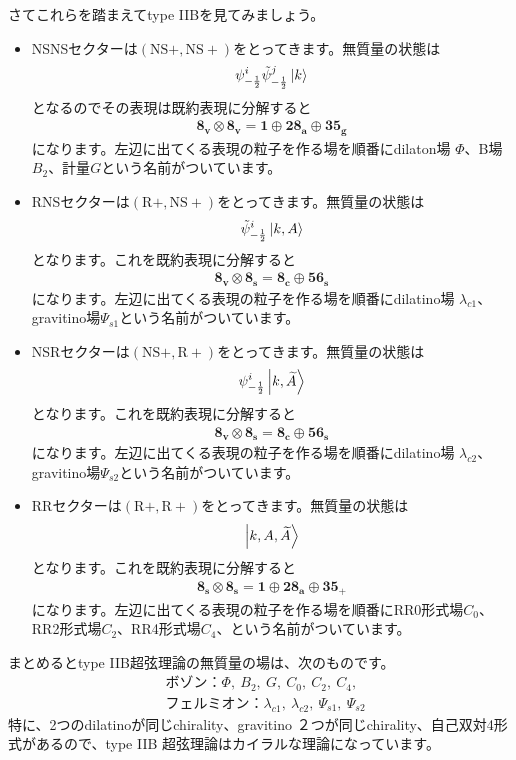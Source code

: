 \documentclass[report,paper=a4, fontsize=12pt, line_length=16cm, number_of_lines=33,dvipdfmx]{jlreq}
\numberwithin{equation}{chapter}
\numberwithin{equation}{section}
\newcommand{\At}{\widetilde{A}}
\newcommand{\psit}{\tilde{\psi}}
\newcommand{\NSp}{\mathrm{NS}+}
\newcommand{\Rp}{\mathrm{R}+}
\newcommand{\triv}{\mathbf{1}}
\newcommand{\etv}{\mathbf{8_v}}
\newcommand{\ets}{\mathbf{8_s}}
\newcommand{\etc}{\mathbf{8_c}}
\newcommand{\tweta}{\mathbf{28_{a}}}
\newcommand{\thfvg}{\mathbf{35_{g}}}
\newcommand{\thfvp}{\mathbf{35}_{+}}
\newcommand{\fsxs}{\mathbf{56_s}}
\begin{document}
さてこれらを踏まえてtype IIBを見てみましょう。
\begin{itemize}
  \item NSNSセクターは$(\NSp,\NSp)$をとってきます。無質量の状態は
  \begin{align}
    \psi_{-\frac12}^{i}\psit_{-\frac12}^{j}\ket{k}
  \end{align}
  となるのでその表現は既約表現に分解すると
  \begin{align}
    \etv\otimes\etv= \triv \oplus \tweta\oplus \thfvg
  \end{align}
  になります。左辺に出てくる表現の粒子を作る場を順番にdilaton場 $\Phi$、B場$B_2$、計量$G$という名前がついています。
  \item RNSセクターは$(\Rp,\NSp)$をとってきます。無質量の状態は
  \begin{align}
    \psit_{-\frac12}^{i}\ket{k,A}
  \end{align}
  となります。これを既約表現に分解すると
  \begin{align}
    \etv\otimes\ets= \etc \oplus \fsxs
  \end{align}
  になります。左辺に出てくる表現の粒子を作る場を順番にdilatino場 $\lambda_{c1}$、gravitino場$\Psi_{s1}$という名前がついています。
  \item NSRセクターは$(\NSp,\Rp)$をとってきます。無質量の状態は
  \begin{align}
    \psi_{-\frac12}^{i}\ket{k,\At}
  \end{align}
  となります。これを既約表現に分解すると
  \begin{align}
    \etv\otimes\ets= \etc \oplus \fsxs
  \end{align}
  になります。左辺に出てくる表現の粒子を作る場を順番にdilatino場 $\lambda_{c2}$、gravitino場$\Psi_{s2}$という名前がついています。
  \item RRセクターは$(\Rp,\Rp)$をとってきます。無質量の状態は
  \begin{align}
    \ket{k,A,\At}
  \end{align}
  となります。これを既約表現に分解すると
  \begin{align}
    \ets\otimes\ets= \triv\oplus \tweta \oplus \thfvp
  \end{align}
  になります。左辺に出てくる表現の粒子を作る場を順番にRR0形式場$C_0$、RR2形式場$C_2$、RR4形式場$C_4$、という名前がついています。
\end{itemize}
まとめるとtype IIB超弦理論の無質量の場は、次のものです。
\begin{align}
  &\text{ボゾン：}\Phi,\ B_2,\ G,\ C_0,\ C_2,\ C_4,\\
  &\text{フェルミオン：} \lambda_{c1},\ \lambda_{c2},\ \Psi_{s1},\ \Psi_{s2}
\end{align}
特に、2つのdilatinoが同じchirality、gravitino ２つが同じchirality、自己双対4形式があるので、type IIB 超弦理論はカイラルな理論になっています。
\end{document}
